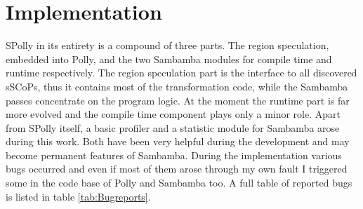 
\chapter{Implementation} %
\label{Chapter4}


SPolly in its entirety is a compound of three parts. The region speculation, 
embedded into Polly, and the two Sambamba modules  for compile time and
runtime respectively. The region speculation part is the interface
to all discovered sSCoPs, thus it contains most of the transformation code, 
while the Sambamba passes concentrate on the program logic. 
At the moment the runtime part is far more evolved and the compile time component
plays only a minor role. Apart from SPolly itself, a basic profiler and a
statistic module for Sambamba arose during this work. Both have been very helpful
during the development and may become permanent features of Sambamba.
   During the implementation various bugs occurred and even if most of them
arose through my own fault I triggered some in the code base of Polly and 
Sambamba too. A full table of reported bugs is listed in table 
\ref{tab:Bugreports}. 

